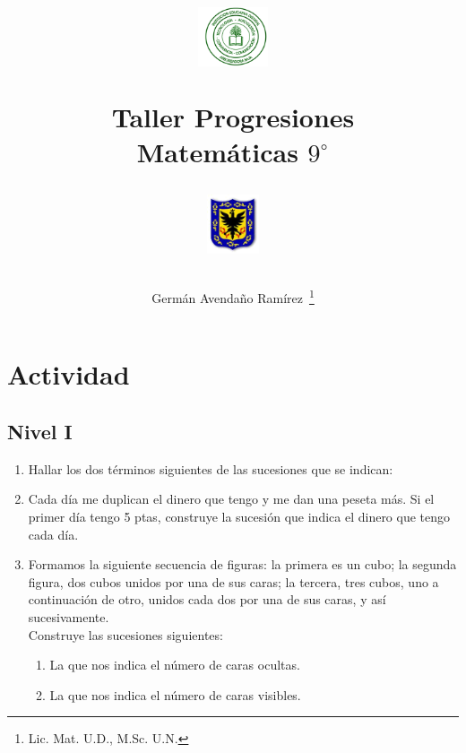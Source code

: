\documentclass[10pt,twoside]{article}
\author{Germ\'an Avenda\~no Ram\'irez~\thanks{Lic. Mat. U.D., M.Sc. U.N.}}
\title{\begin{minipage}{.2\textwidth}
\includegraphics[height=1.75cm]{Images/logo-colegio.png}\end{minipage}
\begin{minipage}{.55\textwidth}
\begin{center}
Taller Progresiones\\
Matemáticas $9^{\circ}$
\end{center}
\end{minipage}\hfill
\begin{minipage}{.2\textwidth}
\includegraphics[height=1.75cm]{Images/logo-sed.png} 
\end{minipage}}
\date{}
\begin{document}
\maketitle
\section*{Actividad}
\subsection*{Nivel I}
\begin{enumerate}
\item Hallar los dos términos siguientes de las sucesiones que se indican:
\begin{enumerate}
\end{enumerate}
\item Cada día me duplican el dinero que tengo y me dan una peseta más. Si el primer día tengo 5 ptas, construye la sucesión que indica el dinero que tengo cada día.
\item Formamos la siguiente secuencia de figuras: la primera es un cubo; la segunda figura, dos cubos unidos por una de sus caras; la tercera, tres cubos, uno a continuación de otro, unidos cada dos por una de sus caras, y así sucesivamente.\\
Construye las sucesiones siguientes:
\begin{enumerate}
\item La que nos indica el número de caras ocultas.
\item La que nos indica el número de caras visibles.\\

\end{enumerate}
\end{enumerate}
\end{document}
